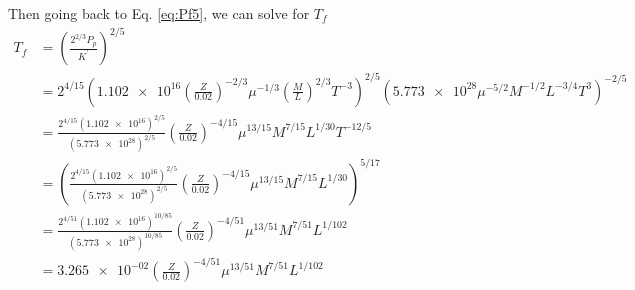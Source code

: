 Then going back to Eq. \ref{eq:Pf5}, we can solve for $T_f$
\begin{align*}
    T_f &= \left(\frac{2^{2/3}P_p}{K^\prime}\right)^{2/5} \\
    &= 2^{4/15}\left(\num{1.102e+16} \left(\frac{Z}{0.02}\right)^{-2/3} \mu^{-1/3} \left(\frac{M}{L}\right)^{2/3}  T^{-3}\right)^{2/5}\left(\num{5.773e+28} \mu^{-5/2} M^{-1/2} L^{-3/4} T^3\right)^{-2/5}\\
    &= \frac{2^{4/15}(\num{1.102e+16})^{2/5}}{(\num{5.773e+28})^{2/5}}\left(\frac{Z}{0.02}\right)^{-4/15}\mu^{13/15}M^{7/15}L^{1/30}T^{-12/5}\\
    &= \left(\frac{2^{4/15}(\num{1.102e+16})^{2/5}}{(\num{5.773e+28})^{2/5}}\left(\frac{Z}{0.02}\right)^{-4/15}\mu^{13/15}M^{7/15}L^{1/30}\right)^{5/17}\\
    &= \frac{2^{4/51}(\num{1.102e+16})^{10/85}}{(\num{5.773e+28})^{10/85}}\left(\frac{Z}{0.02}\right)^{-4/51}\mu^{13/51}M^{7/51}L^{1/102}\\
    &= \num{3.265e-02}\left(\frac{Z}{0.02}\right)^{-4/51}\mu^{13/51}M^{7/51}L^{1/102}
\end{align*}





